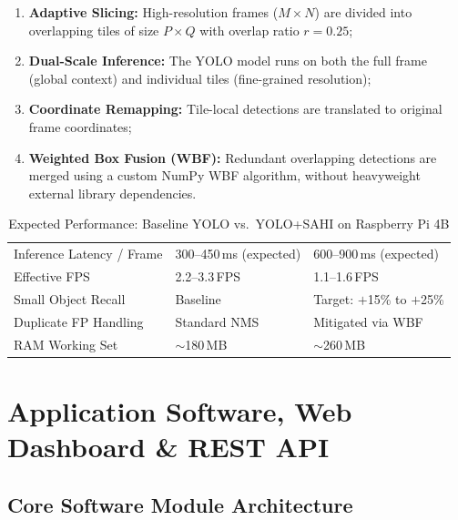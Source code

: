 \documentclass[12pt,a4paper]{article}
\begin{document}
\begin{enumerate}[label=\textbf{\arabic*.}]
  \item \textbf{Adaptive Slicing:} High-resolution frames ($M \times N$) are divided
  into overlapping tiles of size $P \times Q$ with overlap ratio $r = 0.25$;
  \item \textbf{Dual-Scale Inference:} The YOLO model runs on both the full frame
  (global context) and individual tiles (fine-grained resolution);
  \item \textbf{Coordinate Remapping:} Tile-local detections are translated to
  original frame coordinates;
  \item \textbf{Weighted Box Fusion (WBF):} Redundant overlapping detections are merged
  using a custom NumPy WBF algorithm, without heavyweight external library dependencies.
\end{enumerate}

\renewcommand{\arraystretch}{1.25}
\begin{table}[H]
\centering
\caption{Expected Performance: Baseline YOLO vs.\ YOLO+SAHI on Raspberry Pi 4B}
\label{tab:sahi_eval}
\small
\begin{tabularx}{\linewidth}{@{} L{4.8cm} X X @{}}
\toprule
{} &  &  \\
\midrule
{}
Inference Latency / Frame & 300--450\,ms (expected) & 600--900\,ms (expected) \\
Effective FPS             & 2.2--3.3\,FPS           & 1.1--1.6\,FPS \\
Small Object Recall       & Baseline                & Target: $+$15\% to $+$25\% \\
Duplicate FP Handling     & Standard NMS            & Mitigated via WBF \\
RAM Working Set           & $\sim$180\,MB           & $\sim$260\,MB \\
\bottomrule
\end{tabularx}
\end{table}

\clearpage

\section{Application Software, Web Dashboard \& REST API}

\subsection{Core Software Module Architecture}
\end{document}
